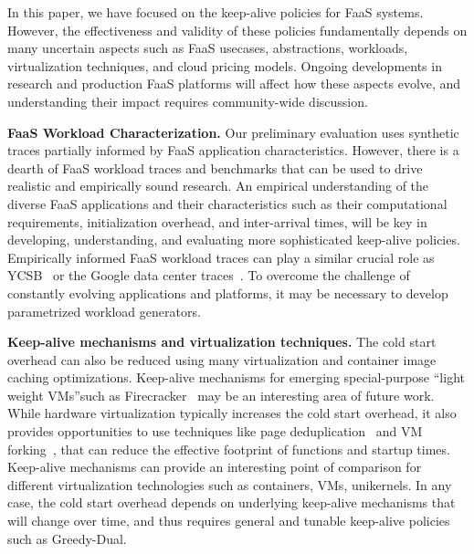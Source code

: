 
In this paper, we have focused on the keep-alive policies for FaaS systems.
%
However, the effectiveness and validity of these policies fundamentally depends on many uncertain aspects such as  FaaS usecases, abstractions, workloads, virtualization techniques, and cloud pricing models. 
%
Ongoing developments in research and production FaaS platforms will affect how these aspects evolve, and understanding their impact requires community-wide discussion. 



\noindent \textbf{FaaS Workload Characterization.}
Our preliminary evaluation uses synthetic traces partially informed by FaaS application characteristics. 
However, there is a dearth of FaaS workload traces and benchmarks that can be used to drive realistic and empirically sound research. 
An empirical understanding of the diverse FaaS applications and their characteristics such as their computational requirements, initialization overhead, and inter-arrival times, will be key in developing, understanding, and evaluating more sophisticated keep-alive policies. 
Empirically informed FaaS workload traces can play a similar crucial role as YCSB~\cite{ycsb-socc2010} or the Google data center traces~\cite{clusterdata:Reiss2011}. 
To overcome the challenge of constantly evolving applications and platforms, it may be necessary to develop parametrized workload generators. 



\noindent \textbf{Keep-alive mechanisms and virtualization techniques.}
The cold start overhead can also be reduced using many virtualization and container image caching optimizations. 
Keep-alive mechanisms for emerging special-purpose ``light weight VMs''such as Firecracker~\cite{firecracker-nsdi20} may be an interesting area of future work. 
While hardware virtualization typically increases the cold start overhead, it also provides opportunities to use techniques like page deduplication~\cite{sharma2012singleton} and VM forking~\cite{lagar2011snowflock}, that can reduce the effective footprint of functions and startup times.
Keep-alive mechanisms can provide an interesting point of comparison for different virtualization technologies such as containers, VMs, unikernels.
In any case, the cold start overhead depends on underlying keep-alive mechanisms that will change over time, and thus requires general and tunable keep-alive policies such as Greedy-Dual. 




